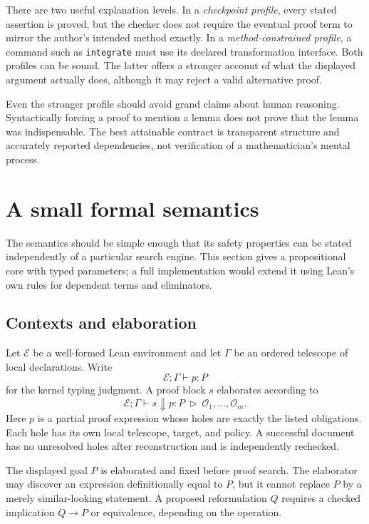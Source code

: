 \documentclass[11pt,a4paper]{article}
\newcommand{\code}[1]{\texttt{\small #1}}
\newcommand{\Env}{\mathcal E}
\newcommand{\Ob}{\mathcal O}
\theoremstyle{definition}
\theoremstyle{remark}
\begin{document}
There are two useful explanation levels. In a \emph{checkpoint profile}, every stated assertion is proved, but the checker does not require the eventual proof term to mirror the author's intended method exactly. In a \emph{method-constrained profile}, a command such as \code{integrate} must use its declared transformation interface. Both profiles can be sound. The latter offers a stronger account of what the displayed argument actually does, although it may reject a valid alternative proof.

Even the stronger profile should avoid grand claims about human reasoning. Syntactically forcing a proof to mention a lemma does not prove that the lemma was indispensable. The best attainable contract is transparent structure and accurately reported dependencies, not verification of a mathematician's mental process.

\section{A small formal semantics}
\label{sec:semantics}
The semantics should be simple enough that its safety properties can be stated independently of a particular search engine. This section gives a propositional core with typed parameters; a full implementation would extend it using Lean's own rules for dependent terms and eliminators.

\subsection{Contexts and elaboration}
Let $\Env$ be a well-formed Lean environment and let $\Gamma$ be an ordered telescope of local declarations. Write
\[
 \Env;\Gamma\vdash p:P
\]
for the kernel typing judgment. A proof block $s$ elaborates according to
\[
 \Env;\Gamma\vdash s\Downarrow p:P\ \triangleright\ \Ob_1,\ldots,\Ob_m.
\]
Here $p$ is a partial proof expression whose holes are exactly the listed obligations. Each hole has its own local telescope, target, and policy. A successful document has no unresolved holes after reconstruction and is independently rechecked.

The displayed goal $P$ is elaborated and fixed before proof search. The elaborator may discover an expression definitionally equal to $P$, but it cannot replace $P$ by a merely similar-looking statement. A proposed reformulation $Q$ requires a checked implication $Q\to P$ or equivalence, depending on the operation.
\end{document}
